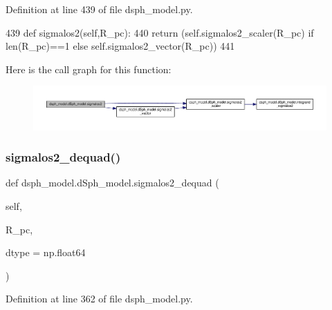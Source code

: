 Definition at line 439 of file dsph\+\_\+model.\+py.


\begin{DoxyCode}
439     \textcolor{keyword}{def }sigmalos2(self,R\_pc):
440         \textcolor{keywordflow}{return} (self.sigmalos2\_scaler(R\_pc) \textcolor{keywordflow}{if} len(R\_pc)==1 \textcolor{keywordflow}{else} self.sigmalos2\_vector(R\_pc))
441     
\end{DoxyCode}
Here is the call graph for this function\+:\nopagebreak
\begin{figure}[H]
\begin{center}
\leavevmode
\includegraphics[width=350pt]{d0/d25/classdsph__model_1_1dSph__model_a7b94850b439fe4afc431cfffa185d415_cgraph}
\end{center}
\end{figure}
\mbox{\label{classdsph__model_1_1dSph__model_a87273cf6ad641b1d12f9b236821807c6}} 
\subsubsection{\texorpdfstring{sigmalos2\+\_\+dequad()}{sigmalos2\_dequad()}}
{\footnotesize\ttfamily def dsph\+\_\+model.\+d\+Sph\+\_\+model.\+sigmalos2\+\_\+dequad (\begin{DoxyParamCaption}\item[{}]{self,  }\item[{}]{R\+\_\+pc,  }\item[{}]{dtype = {\ttfamily np.float64} }\end{DoxyParamCaption})}



Definition at line 362 of file dsph\+\_\+model.\+py.


